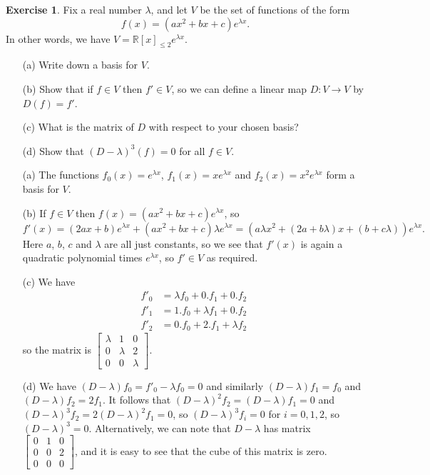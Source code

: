 \documentclass{amsart}
\newcommand{\R}         {{\mathbb{R}}}
\newcommand{\bbm}       {\left[\begin{matrix}}
\newcommand{\ebm}       {\end{matrix}\right]}
\newcommand{\lm}        {\lambda}
\renewcommand{\:}       {\colon}
\theoremstyle{definition}
\newtheorem{exercise}{Exercise}[section]
\renewenvironment{solution}{\SolutionAtEnd}{\endSolutionAtEnd}
\begin{document}
\begin{exercise}
 Fix a real number $\lm$, and let $V$ be the set of functions of the form
 \[ f(x) = (ax^2 + bx + c)e^{\lm x}. \]
 In other words, we have $V=\R[x]_{\leq 2}e^{\lm x}$.
 \begin{itemize}
  \item[(a)] Write down a basis for $V$.
  \item[(b)] Show that if $f\in V$ then $f'\in V$, so we can
  define a linear map $D\:V\to V$ by $D(f)=f'$.
  \item[(c)] What is the matrix of $D$ with respect to your chosen
  basis?
  \item[(d)] Show that $(D-\lm)^3(f)=0$ for all $f\in V$.
 \end{itemize}
\end{exercise}
\begin{solution}
 \begin{itemize}
  \item[(a)] The functions $f_0(x)=e^{\lm x}$, $f_1(x)=xe^{\lm x}$
  and $f_2(x)=x^2e^{\lm x}$ form a basis for $V$.
  \item[(b)] If $f\in V$ then $f(x)=(ax^2+bx+c)e^{\lm x}$, so
   \[ f'(x)=(2ax+b)e^{\lm x} + (ax^2+bx+c)\lm e^{\lm x}
       = (a\lm x^2+(2a+b\lm)x + (b+c\lm))e^{\lm x}.
   \]
   Here $a$, $b$, $c$ and $\lm$ are all just constants, so we see
   that $f'(x)$ is again a quadratic polynomial times $e^{\lm x}$,
   so $f'\in V$ as required.
  \item[(c)]
   We have
   \begin{align*}
    f'_0 &= \lm f_0 + 0. f_1 + 0.f_2 \\
    f'_1 &= 1.f_0 + \lm f_1 + 0.f_2 \\
    f'_2 &= 0.f_0 + 2.f_1 + \lm f_2
   \end{align*}
   so the matrix is $\bbm \lm&1&0 \\ 0&\lm&2 \\ 0&0&\lm\ebm$.
  \item[(d)] We have $(D-\lm)f_0=f'_0-\lm f_0=0$ and similarly
   $(D-\lm)f_1=f_0$ and $(D-\lm)f_2=2f_1$.  It follows that
   $(D-\lm)^2f_2=(D-\lm)f_1=0$ and $(D-\lm)^3f_2=2(D-\lm)^2f_1=0$,
   so $(D-\lm)^3f_i=0$ for $i=0,1,2$, so $(D-\lm)^3=0$.
   Alternatively, we can note that $D-\lm$ has matrix
   $\bbm 0&1&0\\ 0&0&2\\ 0&0&0\ebm$, and it is easy to see that
   the cube of this matrix is zero.
 \end{itemize}
\end{solution}
\end{document}
